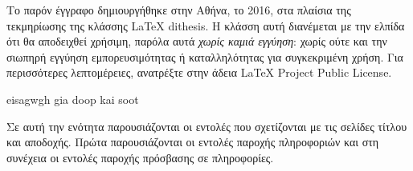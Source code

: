 \documentclass{dithesis}
\begin{document}
\tableofcontents
\listoffigures
\listoftables

\begin{thesisprologue}[Πρόλογος]
    Το παρόν έγγραφο δημιουργήθηκε στην Αθήνα, το 2016, στα πλαίσια της 
    τεκμηρίωσης της κλάσσης \LaTeX{} dithesis.
    Η κλάσση αυτή διανέμεται με την ελπίδα ότι θα αποδειχθεί χρήσιμη, παρόλα αυτά 
    \emph{χωρίς καμιά εγγύηση}: χωρίς ούτε και την σιωπηρή εγγύηση 
    εμπορευσιμότητας ή καταλληλότητας για συγκεκριμένη χρήση.
    Για περισσότερες λεπτομέρειες, ανατρέξτε στην άδεια LaTeX Project Public 
    License.
\end{thesisprologue}

    eisagwgh gia doop kai soot

    Σε αυτή την ενότητα παρουσιάζονται οι εντολές που σχετίζονται με τις σελίδες 
    τίτλου και αποδοχής.
    Πρώτα παρουσιάζονται οι εντολές παροχής πληροφοριών και στη συνέχεια οι εντολές
    παροχής πρόσβασης σε πληροφορίες.
\end{document}
